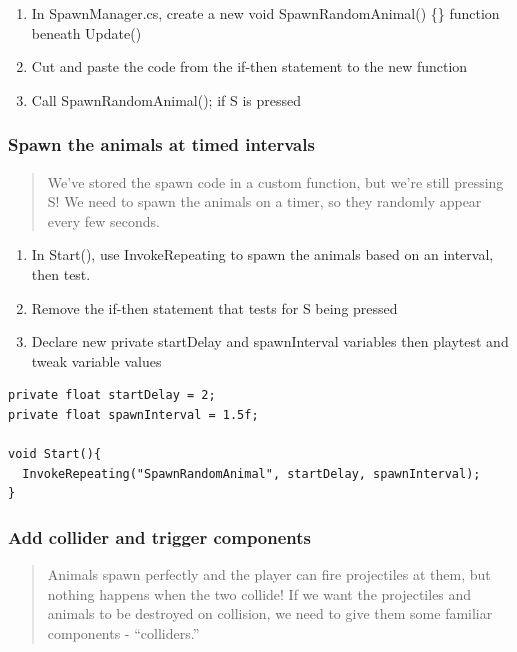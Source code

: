 \documentclass[
]{book}
\providecommand{\tightlist}{%
  \setlength{\itemsep}{0pt}\setlength{\parskip}{0pt}}
\begin{document}
\begin{enumerate}
\def\labelenumi{\arabic{enumi}.}
\tightlist
\item
  In SpawnManager.cs, create a new void SpawnRandomAnimal() \{\} function beneath Update()
\item
  Cut and paste the code from the if-then statement to the new function
\item
  Call SpawnRandomAnimal(); if S is pressed
\end{enumerate}

\hypertarget{spawn-the-animals-at-timed-intervals}{%
\subsubsection{Spawn the animals at timed intervals}\label{spawn-the-animals-at-timed-intervals}}

\begin{quote}
We've stored the spawn code in a custom function, but we're still pressing S! We need to spawn the animals on a timer, so they randomly appear every few seconds.
\end{quote}

\begin{enumerate}
\def\labelenumi{\arabic{enumi}.}
\tightlist
\item
  In Start(), use InvokeRepeating to spawn the animals based on an interval, then test.
\item
  Remove the if-then statement that tests for S being pressed
\item
  Declare new private startDelay and spawnInterval variables then playtest and tweak variable values
\end{enumerate}

\begin{verbatim}
private float startDelay = 2;
private float spawnInterval = 1.5f;

void Start(){
  InvokeRepeating("SpawnRandomAnimal", startDelay, spawnInterval);
}
\end{verbatim}

\hypertarget{add-collider-and-trigger-components}{%
\subsubsection{Add collider and trigger components}\label{add-collider-and-trigger-components}}

\begin{quote}
Animals spawn perfectly and the player can fire projectiles at them, but nothing happens when the two collide! If we want the projectiles and animals to be destroyed on collision, we need to give them some familiar components - ``colliders.''
\end{quote}
\end{document}
